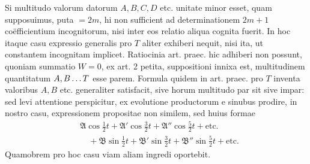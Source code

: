 
Si multitudo valorum datorum $A,B,C,D$ etc. unitate minor esset, quam
supposuimus, puta $=2m$, hi non sufficient ad determinationem $2m+1$ coëfficientium incognitorum, nisi inter eos relatio aliqua cognita fuerit. In hoc itaque casu expressio generalis pro $T$ aliter exhiberi nequit, nisi ita, ut constantem incognitam implicet. Ratiocinia art. praec. hic adhiberi non possunt, quoniam summatio $W=0$, ex art. 2 petita, suppositioni innixa est, multitudinem
quantitatum $A,B\mathinner{.\,.\,.}T$ esse parem. Formula quidem in art. praec. pro $T$ inventa valoribus $A,B$ etc. generaliter satisfacit, sive horum multitudo par sit
sive impar: sed levi attentione perspicitur, ex evolutione productorum e sinubus
prodire, in nostro casu, expressionem propositae non similem, sed huius formae
\[
\begin{aligned}
&\mathfrak{A}\cos\tfrac12t+\mathfrak{A}'\cos\tfrac32t+\mathfrak{A}''\cos\tfrac52t+\text{etc.}\\
&\quad+\mathfrak{B}\sin\tfrac12t+\mathfrak{B}'\sin\tfrac32t+\mathfrak{B}''\sin\tfrac52t+\text{etc.}
\end{aligned}
\]
Quamobrem pro hoc casu viam aliam ingredi oportebit.

